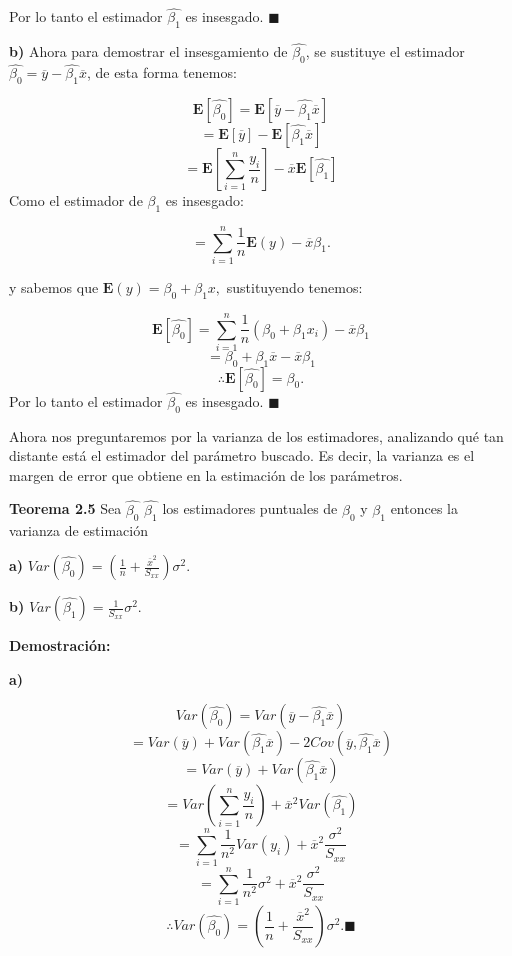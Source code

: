 \documentclass[a4paper,oneside,openany]{book}
\begin{document}
Por lo tanto el estimador \(\hat{\beta_{1}}\) es insesgado.
\(\blacksquare\)

\textbf{b)} Ahora para demostrar el insesgamiento de
\(\hat{\beta_{0}}\), se sustituye el estimador
\(\hat{\beta_{0}}=\overline{y}-\hat{\beta_{1}}\overline{x}\), de esta
forma tenemos:

\[\mathbf{E}\left[\hat{\beta_{0}}\right]=\mathbf{E}\left[\overline{y}-\hat{\beta_{1}}\overline{x}\right]\]
\[=\mathbf{E}\left[\overline{y}\right]-\mathbf{E}\left[\hat{\beta_{1}}\overline{x}\right]\]
\[=\mathbf{E}\left[\sum_{i=1}^{n}\frac{y_{i}}{n}\right]-\overline{x}\mathbf{E}\left[\hat{\beta_{1}}\right]\]
Como el estimador de \(\beta_{1}\) es insesgado:

\[=\sum_{i=1}^{n}\frac{1}{n}\mathbf{E}\left(y\right)-\overline{x}\beta_{1}.\]

y sabemos que \(\mathbf{E}(y)=\beta_{0}+\beta_{1}x,\) sustituyendo
tenemos:

\[\mathbf{E}\left[\hat{\beta_{0}}\right]=\sum_{i=1}^{n}\frac{1}{n}(\beta_{0}+\beta_{1}x_{i})-\overline{x}\beta_{1}\]
\[=\beta_{0}+\beta_{1}\overline{x}-\overline{x}\beta_{1}\]
\[\therefore \mathbf{E}[\hat{\beta_{0}}]=\beta_{0}.\] Por lo tanto el
estimador \(\hat{\beta_{0}}\) es insesgado. \(\blacksquare\)

Ahora nos preguntaremos por la varianza de los estimadores, analizando
qué tan distante está el estimador del parámetro buscado. Es decir, la
varianza es el margen de error que obtiene en la estimación de los
parámetros.

\textbf{Teorema 2.5} Sea \(\hat{\beta_{0}}\) \(\hat{\beta_{1}}\) los
estimadores puntuales de \(\beta_{0}\) y \(\beta_{1}\) entonces la
varianza de estimación

\textbf{a)}
\(Var\left(\hat{\beta_{0}}\right)=\left(\frac{1}{n}+\frac{\overline{x}^2}{S_{xx}}\right) \sigma^2.\)

\textbf{b)}
\(Var\left(\hat{\beta_{1}}\right)= \frac{1}{S_{xx}} \sigma^2.\)

\textbf{Demostración:}

\textbf{a)}

\[Var\left(\hat{\beta_{0}}\right)=Var\left(\overline{y}-\hat{\beta_{1}}\overline{x}\right)\]
\[=Var(\overline{y})+Var(\hat{\beta_{1}}\overline{x})-2Cov(\overline{y},\hat{\beta_{1}}\overline{x})\]
\[=Var(\overline{y})+Var(\hat{\beta_{1}}\overline{x})\]
\[=Var\left(\sum_{i=1}^{n}\frac{y_{i}}{n} \right)+\overline{x}^2Var(\hat{\beta_{1}})\]
\[=\sum_{i=1}^{n}\frac{1}{n^2}Var(y_{i})+\overline{x}^2\frac{\sigma^2}{S_{xx}}\]
\[=\sum_{i=1}^{n}\frac{1}{n^2}\sigma^2+\overline{x}^2\frac{\sigma^2}{S_{xx}}\]
\[\therefore Var\left(\hat{\beta_{0}}\right)=\left(\frac{1}{n}+\frac{\overline{x}^2}{S_{xx}}\right) \sigma^2. \blacksquare\]
\end{document}
